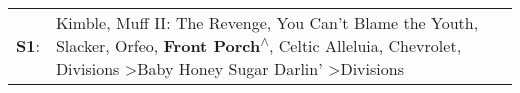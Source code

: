 \begin{supertabular}{p{0.03\textwidth}p{0.92\textwidth}}
 \textbf{S1}:  &  Kimble\textsuperscript{}, \enspace Muff II: The Revenge\textsuperscript{}, \enspace You Can't Blame the Youth\textsuperscript{}, \enspace Slacker\textsuperscript{}, \enspace Orfeo\textsuperscript{}, \enspace \textbf{Front Porch\textsuperscript{$\wedge$}}, \enspace Celtic Alleluia\textsuperscript{}, \enspace Chevrolet\textsuperscript{}, \enspace Divisions\textsuperscript{} \textgreater \enspace Baby Honey Sugar Darlin'\textsuperscript{} \textgreater \enspace Divisions\textsuperscript{}  \enspace  \\
\end{supertabular}
